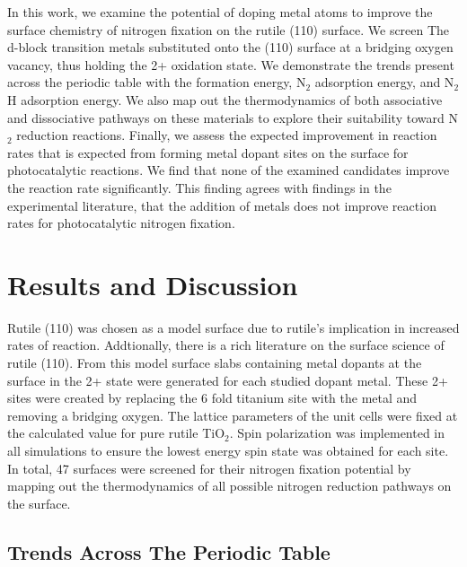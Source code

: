 \documentclass[catalysts,article,submit,moreauthors,pdftex,10pt,a4paper]{mdpi}
\theoremstyle{mdpi}
\newcounter{ex}
\newcounter{re}
\theoremstyle{mdpidefinition}
\begin{document}
In this work, we examine the potential of doping metal atoms to improve the surface chemistry of nitrogen fixation on the rutile (110) surface. We screen The d-block transition metals substituted onto the (110) surface at a bridging oxygen vacancy, thus holding the 2+ oxidation state. We demonstrate the trends present across the periodic table with the formation energy, N$_2$ adsorption energy, and N$_2$H adsorption energy. We also map out the thermodynamics of both associative and dissociative pathways on these materials to explore their suitability toward N$_2$ reduction reactions. Finally, we assess the expected improvement in reaction rates that is expected from forming metal dopant sites on the surface for photocatalytic reactions. We find that none of the examined candidates improve the reaction rate significantly. This finding agrees with findings in the experimental literature, that the addition of metals does not improve reaction rates for photocatalytic nitrogen fixation.

\section{Results and Discussion}
Rutile (110) was chosen as a model surface due to rutile's implication in increased rates of reaction.\cite{Schrauzer_1977} Addtionally, there is a rich literature on the surface science of rutile (110)\cite{Diebold2003,Yates_1991,Lu1994,Walle2009}. From this model surface slabs containing metal dopants at the surface in the 2+ state were generated for each studied dopant metal. These 2+ sites were created by replacing the 6 fold titanium site with the metal and removing a bridging oxygen. The lattice parameters of the unit cells were fixed at the calculated value for pure rutile TiO$_2$. Spin polarization was implemented in all simulations to ensure the lowest energy spin state was obtained for each site. In total, 47  surfaces were screened for their nitrogen fixation potential by mapping out the thermodynamics of all possible nitrogen reduction pathways on the surface.

\subsection{Trends Across The Periodic Table}
\end{document}
